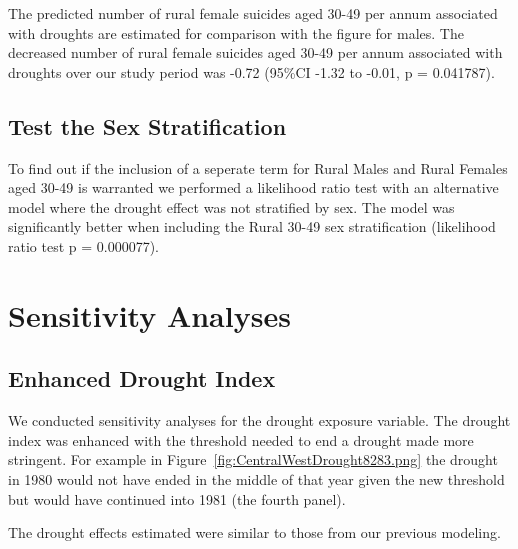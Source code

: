 \documentclass[a4paper]{article}                %
\begin{document}
The predicted number of rural female suicides aged 30-49 per annum associated with droughts are estimated for comparison with the figure for males. The decreased number of rural female suicides aged 30-49 per annum associated with droughts over our study period was -0.72 (95\%CI -1.32 to -0.01,  p = 0.041787).

\subsection{Test the Sex Stratification}
To find out if the inclusion of a seperate term for Rural Males and Rural Females aged 30-49 is warranted we performed a likelihood ratio test with an alternative model where the drought effect was not stratified by sex. The model was significantly better when including the Rural 30-49 sex stratification (likelihood ratio test p = 0.000077).

\section{Sensitivity Analyses}





\subsection{Enhanced Drought Index}


        We conducted sensitivity analyses for the drought exposure variable.  The drought index was enhanced with the threshold needed to end a drought made more stringent.  For example in Figure~\ref{fig:CentralWestDrought8283.png} the drought in 1980 would not have ended in the middle of that year given the new threshold but would have continued into 1981 (the fourth panel).

        The drought effects estimated were similar to those from our previous modeling.
\end{document}

